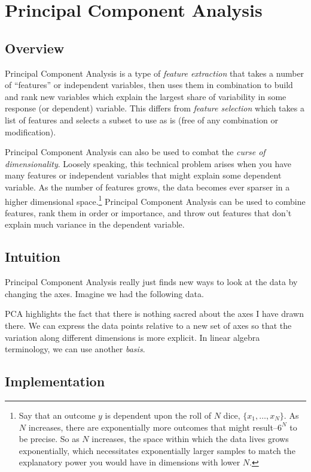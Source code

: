 \documentclass[12pt]{article}
\begin{document}
\section{Principal Component Analysis}
\subsection{Overview}

Principal Component Analysis is a type of \emph{feature extraction}
that takes a number of ``features'' or independent variables, then 
uses them in combination to build and rank new variables which 
explain the largest share of variability in some response (or
dependent) variable. This differs from \emph{feature selection}
which takes a list of features and selects a subset to use as is
(free of any combination or modification).

Principal Component Analysis can also be used to combat the 
\emph{curse of dimensionality}.  Loosely speaking, this technical
problem arises when you have many features or independent variables
that might explain some dependent variable. As the number of 
features grows, the data becomes ever sparser in a higher 
dimensional space.\footnote{Say that an outcome $y$ is dependent
upon the roll of $N$ dice, $\{x_1, \ldots, x_N\}$. As $N$ increases, 
there are exponentially more outcomes that might 
result--$6^N$ to be precise. So as $N$ increases, the space within 
which the data lives grows exponentially, which necessitates 
exponentially larger samples to match the explanatory power you
would have in dimensions with lower $N$.}
Principal Component Analysis can be used to combine features, rank
them in order or importance, and throw out features that don't
explain much variance in the dependent variable.


\subsection{Intuition}

Principal Component Analysis really just finds new ways
to look at the data by changing the axes.  Imagine we had
the following data.

PCA highlights the fact that there is nothing sacred
about the axes I have drawn there.  We can express the
data points relative to a new set of axes so that the
variation along different dimensions is more explicit. In
linear algebra terminology, we can use another \emph{basis}.

\subsection{Implementation}





\end{document}
